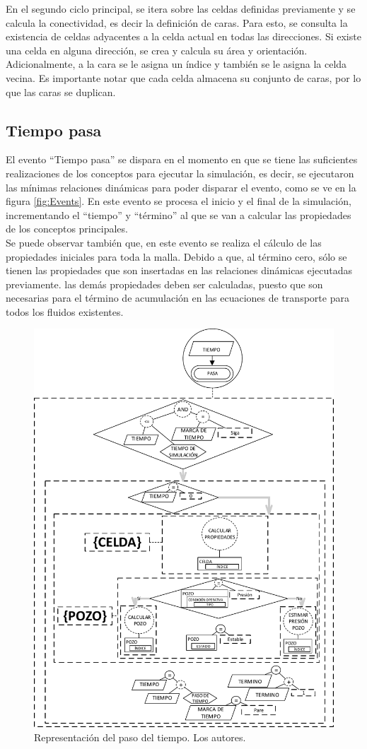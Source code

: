 En el segundo ciclo principal, se itera sobre las celdas definidas previamente y se calcula la conectividad, es decir la definición de caras. Para esto, se consulta la existencia de celdas adyacentes a la celda actual en todas las direcciones. Si existe una celda en alguna dirección, se crea y calcula su área y orientación. Adicionalmente, a la cara se le asigna un índice y también se le asigna la celda vecina. Es importante notar que cada celda almacena su conjunto de caras, por lo que las caras se duplican.

\subsection{Tiempo pasa}
El evento ``Tiempo pasa'' se dispara en el momento en que se tiene las suficientes realizaciones de los conceptos para ejecutar la simulación, es decir, se ejecutaron las mínimas relaciones dinámicas para poder disparar el evento, como se ve en la figura \ref{fig:Events}. En este evento se procesa el inicio y el final de la simulación, incrementando el ``tiempo'' y ``término'' al que se van a calcular las propiedades de los conceptos principales.\\

Se puede observar también que, en este evento se realiza el cálculo de las propiedades iniciales para toda la malla. Debido a que, al término cero, sólo se tienen las propiedades que son insertadas en las relaciones dinámicas ejecutadas previamente. las demás propiedades deben ser calculadas, puesto que son necesarias para el término de acumulación en las ecuaciones de transporte para todos los fluidos existentes.

\begin{figure}[h]
	\centering%
	\includegraphics[width=0.7\linewidth]{Fig/TiempoPasa.pdf}%
	\caption{Representación del paso del tiempo. Los autores.} \label{fig:TimePasses}
\end{figure}


